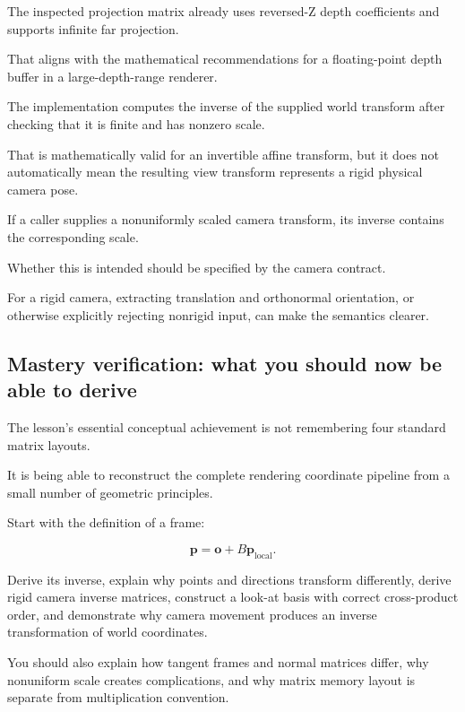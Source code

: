 The inspected projection matrix already uses reversed-Z depth coefficients and supports infinite far projection.

That aligns with the mathematical recommendations for a floating-point depth buffer in a large-depth-range renderer.

The  implementation computes the inverse of the supplied world transform after checking that it is finite and has nonzero scale.

That is mathematically valid for an invertible affine transform, but it does not automatically mean the resulting view transform represents a rigid physical camera pose.

If a caller supplies a nonuniformly scaled camera transform, its inverse contains the corresponding scale.

Whether this is intended should be specified by the camera contract.

For a rigid camera, extracting translation and orthonormal orientation, or otherwise explicitly rejecting nonrigid input, can make the semantics clearer.

\subsection{Mastery verification: what you should now be able to derive}\label{02-foundations-ii-ch037-mastery-verification-what-you-should-now-be-able-to-derive}

\hypertarget{02-foundations-ii-ch037-mastery-verification-what-you-should-now-be-able-to-derive}{}

The lesson's essential conceptual achievement is not remembering four standard matrix layouts.

It is being able to reconstruct the complete rendering coordinate pipeline from a small number of geometric principles.

Start with the definition of a frame:

\[
 \mathbf p=\mathbf o+B\mathbf p_{\mathrm{local}}.
\]

Derive its inverse, explain why points and directions transform differently, derive rigid camera inverse matrices, construct a look-at basis with correct cross-product order, and demonstrate why camera movement produces an inverse transformation of world coordinates.

You should also explain how tangent frames and normal matrices differ, why nonuniform scale creates complications, and why matrix memory layout is separate from multiplication convention.

